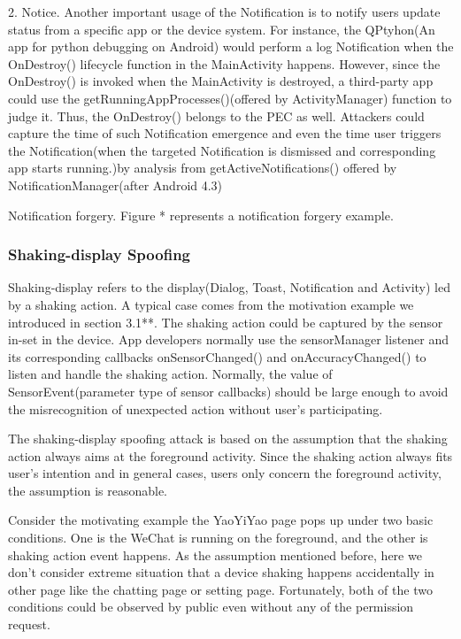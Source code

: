 \documentclass{sig-alternate-05-2015}
\begin{document}
2. Notice. Another important usage of the Notification is to notify users update status from a specific app or the device system. For instance, the QPtyhon(An app for python debugging on Android) would perform a log Notification when the OnDestroy() lifecycle function in the MainActivity happens. However, since the OnDestroy() is invoked when the MainActivity is destroyed, a third-party app could use the getRunningAppProcesses()(offered by ActivityManager) function to judge it. Thus, the OnDestroy() belongs to the PEC as well. Attackers could capture the time of such Notification emergence and even the time user triggers the Notification(when the targeted Notification is dismissed and corresponding app starts running.)by analysis from getActiveNotifications() offered by NotificationManager(after Android 4.3) 

Notification forgery. Figure * represents a notification forgery example. 

\subsubsection{Shaking-display Spoofing}
Shaking-display refers to the display(Dialog, Toast, Notification and Activity) led by a shaking action. A typical case comes from the motivation example we introduced in section 3.1**. The shaking action could be captured by the sensor in-set in the device. App developers normally use the sensorManager listener and its corresponding callbacks onSensorChanged() and onAccuracyChanged() to listen and handle the shaking action. Normally, the value of SensorEvent(parameter type of sensor callbacks) should be large enough to avoid the misrecognition of unexpected action without user's participating.

The shaking-display spoofing attack is based on the assumption that the shaking action always aims at the foreground activity. Since the shaking action always fits user's intention and in general cases, users only concern the foreground activity, the assumption is reasonable.

Consider the motivating example the YaoYiYao page pops up under two basic conditions. One is the WeChat is running on the foreground, and the other is shaking action event happens. As the assumption mentioned before, here we don't consider extreme situation that a device shaking happens accidentally in other page like the chatting page or setting page. Fortunately, both of the two conditions could be observed by public even without any of the permission request. 
\end{document}
